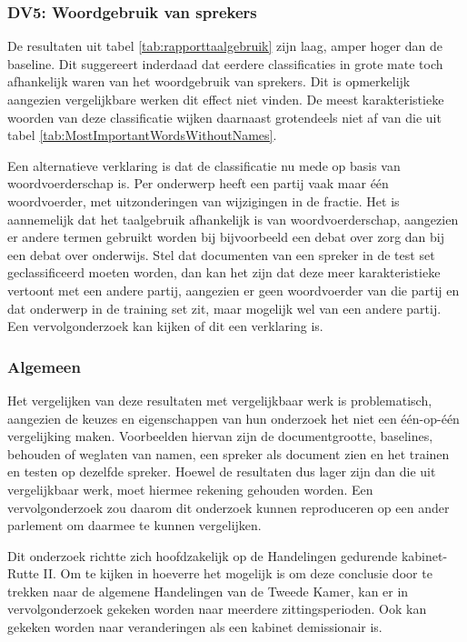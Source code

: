 \subsubsection{DV5: Woordgebruik van sprekers}
De resultaten uit tabel \ref{tab:rapporttaalgebruik} zijn laag, amper hoger dan de baseline. Dit suggereert inderdaad dat eerdere classificaties in grote mate toch afhankelijk waren van het woordgebruik van sprekers. Dit is opmerkelijk aangezien vergelijkbare werken dit effect niet vinden. De meest karakteristieke woorden van deze classificatie wijken daarnaast grotendeels niet af van die uit tabel \ref{tab:MostImportantWordsWithoutNames}.\par
Een alternatieve verklaring is dat de classificatie nu mede op basis van woordvoerderschap is. Per onderwerp heeft een partij vaak maar één woordvoerder, met uitzonderingen van wijzigingen in de fractie. Het is aannemelijk dat het taalgebruik afhankelijk is van woordvoerderschap, aangezien er andere termen gebruikt worden bij bijvoorbeeld een debat over zorg dan bij een debat over onderwijs. Stel dat documenten van een spreker in de test set geclassificeerd moeten worden, dan kan het zijn dat deze meer karakteristieke vertoont met een andere partij, aangezien er geen woordvoerder van die partij en dat onderwerp in de training set zit, maar mogelijk wel van een andere partij. Een vervolgonderzoek kan kijken of dit een verklaring is. \par

\subsubsection{Algemeen}
Het vergelijken van deze resultaten met vergelijkbaar werk is problematisch, aangezien de keuzes en eigenschappen van hun onderzoek het niet een één-op-één vergelijking maken. Voorbeelden hiervan zijn de documentgrootte, baselines, behouden of weglaten van namen, een spreker als document zien en het trainen en testen op dezelfde spreker. Hoewel de resultaten dus lager zijn dan die uit vergelijkbaar werk, moet hiermee rekening gehouden worden. Een vervolgonderzoek zou daarom dit onderzoek kunnen reproduceren op een ander parlement om daarmee te kunnen vergelijken.\par
Dit onderzoek richtte zich hoofdzakelijk op de Handelingen gedurende kabinet-Rutte II. Om te kijken in hoeverre het mogelijk is om deze conclusie door te trekken naar de algemene Handelingen van de Tweede Kamer, kan er in vervolgonderzoek gekeken worden naar meerdere zittingsperioden. Ook kan gekeken worden naar veranderingen als een kabinet demissionair is.\par